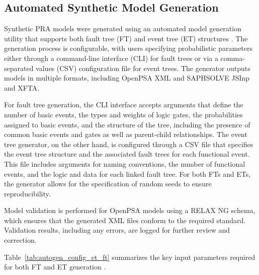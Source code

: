 \subsection{Automated Synthetic Model Generation}

Synthetic PRA models were generated using an automated model generation utility that supports both fault tree (FT) and event tree (ET) structures \cite{earthperson_pra_2022}. The generation process is configurable, with users specifying probabilistic parameters either through a command-line interface (CLI) for fault trees or via a comma-separated values (CSV) configuration file for event trees. The generator outputs models in multiple formats, including OpenPSA XML and SAPHSOLVE JSInp and XFTA.

For fault tree generation, the CLI interface accepts arguments that define the number of basic events, the types and weights of logic gates, the probabilities assigned to basic events, and the structure of the tree, including the presence of common basic events and gates as well as parent-child relationships. The event tree generator, on the other hand, is configured through a CSV file that specifies the event tree structure and the associated fault trees for each functional event. This file includes arguments for naming conventions, the number of functional events, and the logic and data for each linked fault tree. For both FTs and ETs, the generator allows for the specification of random seeds to ensure reproducibility.

Model validation is performed for OpenPSA models using a RELAX NG schema, which ensures that the generated XML files conform to the required standard. Validation results, including any errors, are logged for further review and correction.

Table~\ref{tab:autogen_config_et_ft} summarizes the key input parameters required for both FT and ET generation \cite{Farag2023Benchmarking}.


